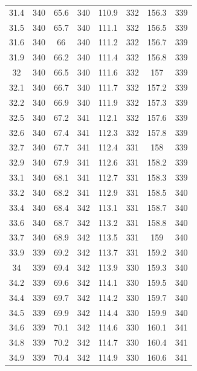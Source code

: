 \documentclass[12pt]{ctexart}
\numberwithin{equation}{section}
\begin{document}
\begin{longtable}{cc|cc|cc|cc}
31.4  &  340  &  65.6  &  340  &  110.9  &  332  &  156.3  &  339  \\
31.5  &  340  &  65.7  &  340  &  111.1  &  332  &  156.5  &  339  \\
31.6  &  340  &  66  &  340  &  111.2  &  332  &  156.7  &  339  \\
31.9  &  340  &  66.2  &  340  &  111.4  &  332  &  156.8  &  339  \\
32  &  340  &  66.5  &  340  &  111.6  &  332  &  157  &  339  \\
32.1  &  340  &  66.7  &  340  &  111.7  &  332  &  157.2  &  339  \\
32.2  &  340  &  66.9  &  340  &  111.9  &  332  &  157.3  &  339  \\
32.5  &  340  &  67.2  &  341  &  112.1  &  332  &  157.6  &  339  \\
32.6  &  340  &  67.4  &  341  &  112.3  &  332  &  157.8  &  339  \\
32.7  &  340  &  67.7  &  341  &  112.4  &  331  &  158  &  339  \\
32.9  &  340  &  67.9  &  341  &  112.6  &  331  &  158.2  &  339  \\
33.1  &  340  &  68.1  &  341  &  112.7  &  331  &  158.3  &  339  \\
33.2  &  340  &  68.2  &  341  &  112.9  &  331  &  158.5  &  340  \\
33.4  &  340  &  68.4  &  342  &  113.1  &  331  &  158.7  &  340  \\
33.6  &  340  &  68.7  &  342  &  113.2  &  331  &  158.8  &  340  \\
33.7  &  340  &  68.9  &  342  &  113.5  &  331  &  159  &  340  \\
33.9  &  339  &  69.2  &  342  &  113.7  &  331  &  159.2  &  340  \\
34  &  339  &  69.4  &  342  &  113.9  &  330  &  159.3  &  340  \\
34.2  &  339  &  69.6  &  342  &  114.1  &  330  &  159.5  &  340  \\
34.4  &  339  &  69.7  &  342  &  114.2  &  330  &  159.7  &  340  \\
34.5  &  339  &  69.9  &  342  &  114.4  &  330  &  159.9  &  340  \\
34.6  &  339  &  70.1  &  342  &  114.6  &  330  &  160.1  &  341  \\
34.8  &  339  &  70.2  &  342  &  114.7  &  330  &  160.4  &  341  \\
34.9  &  339  &  70.4  &  342  &  114.9  &  330  &  160.6  &  341  \\

\end{longtable}
\end{document}
